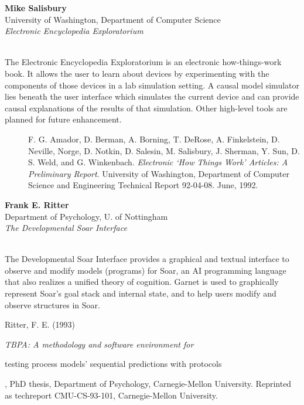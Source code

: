\begin{center}
\end{center}
\begin{tabular}
{\bf Mike Salisbury}\\
University of Washington, Department of Computer Science\\
{\it Electronic Encyclopedia Exploratorium}\\
\\
\end{tabular}
The Electronic Encyclopedia Exploratorium is an electronic
how-things-work book.  It allows the user to learn about devices
by experimenting with the components of
those devices in a lab simulation setting.  A causal model simulator
lies beneath the user
interface which simulates the current device and can provide
causal explanations of the results of that simulation.  Other
high-level tools are planned for future enhancement.
\begin{description}
\item[] F. G. Amador, D. Berman, A. Borning, T. DeRose, A. Finkelstein, D.
Neville, Norge, D. Notkin, D. Salesin, M. Salisbury, J. Sherman, Y.
Sun, D. S. Weld, and G. Winkenbach.  {\it Electronic `How Things Work'
Articles: A Preliminary Report}.  University of
Washington, Department of Computer Science and Engineering Technical
Report 92-04-08. June, 1992.
\end{description}

\newpage{}



\begin{center}
\end{center}
\begin{tabular}
{\bf Frank E. Ritter}\\
Department of Psychology, U. of Nottingham\\
{\it The Developmental Soar Interface}\\
\\
\end{tabular}
The Developmental Soar Interface provides a graphical and
textual interface to observe and modify models (programs) for Soar, an
AI programming language that also realizes a unified theory of
cognition.  Garnet is used to graphically represent Soar's goal stack
and internal state, and to help users modify and observe structures in
Soar.
\begin{description}
Ritter, F. E. (1993) {\it TBPA: A methodology and software environment for
\item[] testing process models' sequential predictions with protocols}, PhD
thesis, Department of Psychology, Carnegie-Mellon University.
Reprinted as techreport CMU-CS-93-101, Carnegie-Mellon University.
\end{description}

